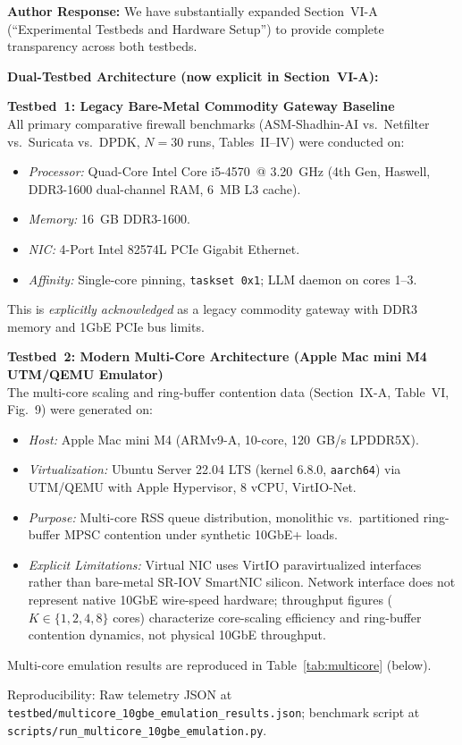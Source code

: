 \documentclass[10pt,letterpaper]{article}
\begin{document}
\begin{authorbox}
\textbf{Author Response:}
We have substantially expanded Section~VI-A (``Experimental Testbeds and
Hardware Setup'') to provide complete transparency across both testbeds.

\textbf{Dual-Testbed Architecture (now explicit in Section~VI-A):}

\textbf{Testbed~1: Legacy Bare-Metal Commodity Gateway Baseline} \\
All primary comparative firewall benchmarks (ASM-Shadhin-AI vs.\ Netfilter
vs.\ Suricata vs.\ DPDK, $N=30$ runs, Tables~II--IV) were conducted on:
\begin{itemize}
  \item \textit{Processor:} Quad-Core Intel Core i5-4570~@ 3.20~GHz (4th Gen,
    Haswell, DDR3-1600 dual-channel RAM, 6~MB L3 cache).
  \item \textit{Memory:} 16~GB DDR3-1600.
  \item \textit{NIC:} 4-Port Intel 82574L PCIe Gigabit Ethernet.
  \item \textit{Affinity:} Single-core pinning, \texttt{taskset~0x1}; LLM daemon
    on cores 1--3.
\end{itemize}
This is \emph{explicitly acknowledged} as a legacy commodity gateway with
DDR3 memory and 1GbE PCIe bus limits.

\textbf{Testbed~2: Modern Multi-Core Architecture (Apple Mac mini M4 UTM/QEMU
Emulator)} \\
The multi-core scaling and ring-buffer contention data (Section~IX-A,
Table~VI, Fig.~9) were generated on:
\begin{itemize}
  \item \textit{Host:} Apple Mac mini M4 (ARMv9-A, 10-core, 120~GB/s LPDDR5X).
  \item \textit{Virtualization:} Ubuntu Server 22.04 LTS (kernel 6.8.0,
    \texttt{aarch64}) via UTM/QEMU with Apple Hypervisor, 8 vCPU, VirtIO-Net.
  \item \textit{Purpose:} Multi-core RSS queue distribution, monolithic vs.\
    partitioned ring-buffer MPSC contention under synthetic 10GbE+ loads.
  \item \textit{Explicit Limitations:} Virtual NIC uses VirtIO paravirtualized
    interfaces rather than bare-metal SR-IOV SmartNIC silicon. Network
    interface does not represent native 10GbE wire-speed hardware; throughput
    figures ($K \in \{1,2,4,8\}$ cores) characterize core-scaling efficiency
    and ring-buffer contention dynamics, not physical 10GbE throughput.
\end{itemize}


Multi-core emulation results are reproduced in Table~\ref{tab:multicore} (below).

Reproducibility: Raw telemetry JSON at
\texttt{testbed/multicore\_10gbe\_emulation\_results.json};
benchmark script at
\texttt{scripts/run\_multicore\_10gbe\_emulation.py}.
\end{authorbox}
\end{document}
